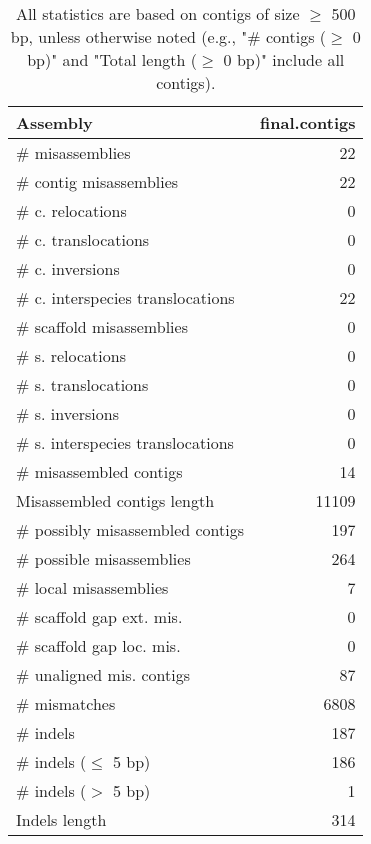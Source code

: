 \documentclass[12pt,a4paper]{article}
\begin{document}
\begin{table}[ht]
\begin{center}
\caption{All statistics are based on contigs of size $\geq$ 500 bp, unless otherwise noted (e.g., "\# contigs ($\geq$ 0 bp)" and "Total length ($\geq$ 0 bp)" include all contigs).}
\begin{tabular}{|l*{1}{|r}|}
\hline
Assembly & final.contigs \\ \hline
\# misassemblies & 22 \\ \hline
\hspace{2mm}\# contig misassemblies & 22 \\ \hline
\hspace{5mm}\# c. relocations & 0 \\ \hline
\hspace{5mm}\# c. translocations & 0 \\ \hline
\hspace{5mm}\# c. inversions & 0 \\ \hline
\hspace{5mm}\# c. interspecies translocations & 22 \\ \hline
\hspace{2mm}\# scaffold misassemblies & 0 \\ \hline
\hspace{5mm}\# s. relocations & 0 \\ \hline
\hspace{5mm}\# s. translocations & 0 \\ \hline
\hspace{5mm}\# s. inversions & 0 \\ \hline
\hspace{5mm}\# s. interspecies translocations & 0 \\ \hline
\# misassembled contigs & 14 \\ \hline
Misassembled contigs length & 11109 \\ \hline
\# possibly misassembled contigs & 197 \\ \hline
\hspace{5mm}\# possible misassemblies & 264 \\ \hline
\# local misassemblies & 7 \\ \hline
\# scaffold gap ext. mis. & 0 \\ \hline
\# scaffold gap loc. mis. & 0 \\ \hline
\# unaligned mis. contigs & 87 \\ \hline
\# mismatches & 6808 \\ \hline
\# indels & 187 \\ \hline
\hspace{5mm}\# indels ($\leq$ 5 bp) & 186 \\ \hline
\hspace{5mm}\# indels ($>$ 5 bp) & 1 \\ \hline
Indels length & 314 \\ \hline
\end{tabular}
\end{center}
\end{table}
\end{document}
